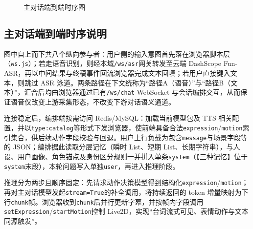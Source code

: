 \documentclass{base}
\newcommand{\SeqYScale}{1.95}
\begin{document}
\begin{figure}[H]
{
    }
    \caption{主对话端到端时序图}
    \label{fig:seq_main_dialogue}
\end{figure}

\subsection{主对话端到端时序说明}

图中自上而下共八个纵向参与者：用户侧的输入意图首先落在浏览器脚本层（\texttt{ws.js}）；若走语音识别，则经本域\texttt{/ws/asr}网关转发至云端 DashScope Fun-ASR，再以中间结果与终稿事件回流浏览器完成文本回填；若用户直接键入文本，则跳过 ASR 泳道。两条路径在下文统称为``路径A（语音）''与``路径B（文本）''，汇合后均由浏览器通过已有\texttt{/ws/chat} WebSocket 与会话编排交互，从而保证语音仅改变上游采集形态，不改变下游对话语义通道。

连接稳定后，编排端按需访问 Redis/MySQL：加载当前模型包及 TTS 相关配置，并以\texttt{type:catalog}等形式下发浏览器，使前端具备合法\texttt{expression}/\texttt{motion}索引集合，供后续动作字段校验与回退。用户上行负载为包含\texttt{message}与场景字段等的 JSON；编排据此读取分层记忆（瞬时 List、短期 List、长期字符串），与人设、用户画像、角色锚点及身份区分规则一并拼入单条\texttt{system}（【三种记忆】位于\texttt{system}末段），本轮问题写入单独\texttt{user}，再进入推理阶段。

推理分为两步且顺序固定：先请求动作决策模型得到结构化\texttt{expression}/\texttt{motion}；再对主对话模型发起\texttt{stream=True}的补全调用，将持续返回的 token 增量映射为下行\texttt{chunk}帧。浏览器收到\texttt{chunk}后并行更新字幕，并按帧内字段调用\texttt{setExpression}/\texttt{startMotion}控制 Live2D，实现``台词流式可见、表情动作与文本同源触发''。
\end{document}
